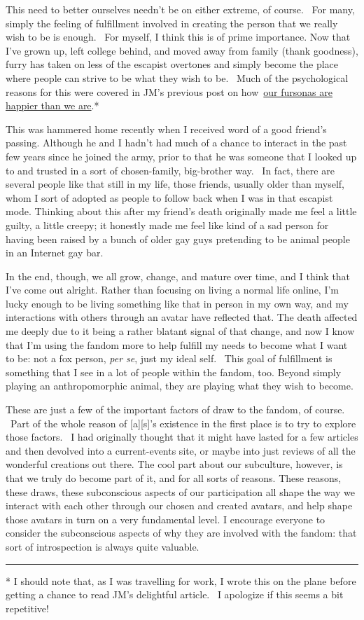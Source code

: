 This need to better ourselves needn't be on either extreme, of course.
~For many, simply the feeling of fulfillment involved in creating the
person that we really wish to be is enough. ~For myself, I think this is
of prime importance. Now that I've grown up, left college behind, and
moved away from family (thank goodness), furry has taken on less of the
escapist overtones and simply become the place where people can strive
to be what they wish to be. ~Much of the psychological reasons for this
were covered in JM's previous post on
how~\href{http://adjectivespecies.com/2012/09/17/our-fursonas-are-happier-than-we-are/}{our
fursonas are happier than we are}.*

This was hammered home recently when I received word of a good friend's
passing. Although he and I hadn't had much of a chance to interact in
the past few years since he joined the army, prior to that he was
someone that I looked up to and trusted in a sort of chosen-family,
big-brother way. ~In fact, there are several people like that still in
my life, those friends, usually older than myself, whom I sort of
adopted as people to follow back when I was in that escapist mode.
Thinking about this after my friend's death originally made me feel a
little guilty, a little creepy; it honestly made me feel like kind of a
sad person for having been raised by a bunch of older gay guys
pretending to be animal people in an Internet gay bar.

In the end, though, we all grow, change, and mature over time, and I
think that I've come out alright. Rather than focusing on living a
normal life online, I'm lucky enough to be living something like that in
person in my own way, and my interactions with others through an avatar
have reflected that. The death affected me deeply due to it being a
rather blatant signal of that change, and now I know that I'm using the
fandom more to help fulfill my needs to become what I want to be: not a
fox person, \emph{per se}, just my ideal self. ~This goal of fulfillment
is something that I see in a lot of people within the fandom, too.
Beyond simply playing an anthropomorphic animal, they are playing what
they wish to become.

These are just a few of the important factors of draw to the fandom, of
course. ~Part of the whole reason of {[}a{]}{[}s{]}'s existence in the
first place is to try to explore those factors. ~I had originally
thought that it might have lasted for a few articles and then devolved
into a current-events site, or maybe into just reviews of all the
wonderful creations out there. The cool part about our subculture,
however, is that we truly do become part of it, and for all sorts of
reasons. These reasons, these draws, these subconscious aspects of our
participation all shape the way we interact with each other through our
chosen and created avatars, and help shape those avatars in turn on a
very fundamental level. I encourage everyone to consider the
subconscious aspects of why they are involved with the fandom: that sort
of introspection is always quite valuable.

\begin{center}\rule{0.5\linewidth}{\linethickness}\end{center}

* I should note that, as I was travelling for work, I wrote this on the
plane before getting a chance to read JM's delightful article. ~I
apologize if this seems a bit repetitive!
